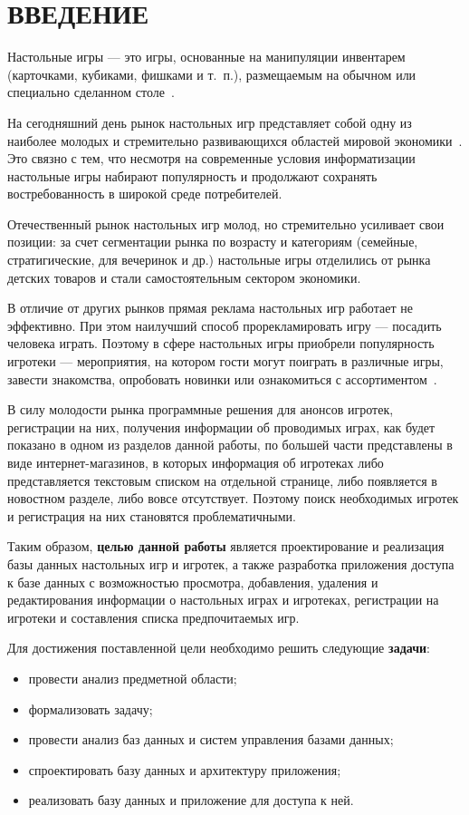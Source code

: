\chapter*{ВВЕДЕНИЕ}

Настольные игры --- это игры, основанные на манипуляции инвентарем (карточками,
кубиками, фишками и т.~п.), размещаемым на обычном или специально сделанном
столе~\cite{art01}.

На сегодняшний день рынок настольных игр представляет собой одну из наиболее
молодых и стремительно развивающихся областей мировой
экономики~\cite{art02}. Это связно с тем, что несмотря на современные условия
информатизации настольные игры набирают популярность и продолжают сохранять
востребованность в широкой среде потребителей.

Отечественный рынок настольных игр молод, но стремительно усиливает свои
позиции: за счет сегментации рынка по возрасту и категориям (семейные,
стратигические, для вечеринок и др.) настольные игры отделились от рынка
детских товаров и стали самостоятельным сектором экономики.

В отличие от других рынков прямая реклама настольных игр работает не эффективно.
При этом наилучший способ прорекламировать игру --- посадить человека играть.
Поэтому в сфере настольных игры приобрели популярность игротеки --- мероприятия,
на котором гости могут поиграть в различные игры, завести знакомства, опробовать
новинки или ознакомиться с ассортиментом~\cite{art03}.

В силу молодости рынка программные решения для анонсов игротек, регистрации на
них, получения информации об проводимых играх, как будет показано в одном из
разделов данной работы, по большей части представлены в виде интернет-магазинов,
в которых информация об игротеках либо представляется текстовым списком на
отдельной странице, либо появляется в новостном разделе, либо вовсе отсутствует.
Поэтому поиск необходимых игротек и регистрация на них становятся
проблематичными.

Таким образом, \textbf{целью данной работы} является проектирование и реализация
базы данных настольных игр и игротек, а также разработка приложения доступа к
базе данных с возможностью просмотра, добавления, удаления и редактирования
информации о настольных играх и игротеках, регистрации на игротеки и составления
списка предпочитаемых игр.

Для достижения поставленной цели необходимо решить следующие \textbf{задачи}:
\begin{itemize}[left=\parindent]
    \item провести анализ предметной области;
    \item формализовать задачу;
    \item провести анализ баз данных и систем управления базами данных;
    \item спроектировать базу данных и архитектуру приложения;
    \item реализовать базу данных и приложение для доступа к ней.
\end{itemize}

